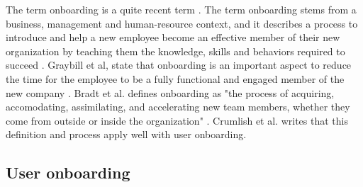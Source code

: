 The term onboarding is a quite recent term \cite{Dai2007}. The term onboarding stems from a business, management and human-resource context, and it describes a process to introduce and help a new employee become an effective member of their new organization by teaching them the knowledge, skills and behaviors required to succeed \cite{Bauer2011}. Graybill et al, state that onboarding is an important aspect to reduce the time for the employee to be a fully functional and engaged member of the new company \cite{GraybillJolieO;HudsonCarpenterMariaTaesil;OffordJeromeJr;PiorunMary;Shaffer2013}. Bradt et al. defines onboarding as "the process of acquiring, accomodating, assimilating, and accelerating new team members, whether they come from outside or inside the organization" \cite{Bradt2009}. Crumlish et al. \cite{Crumlish2009} writes that this definition and process apply well with user onboarding.

\subsection{User onboarding}
